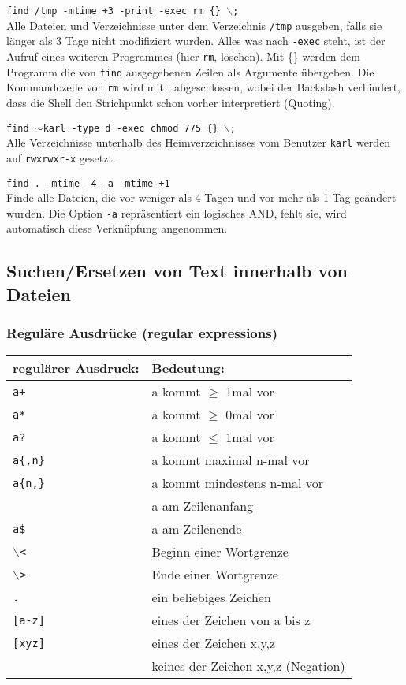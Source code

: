 \documentclass[11pt]{article}
\begin{document}
\texttt{find /tmp -mtime +3 -print -exec rm \{\} $\backslash$;} \\
Alle Dateien und Verzeichnisse unter dem Verzeichnis \texttt{/tmp}
ausgeben, falls sie länger als 3 Tage nicht modifiziert wurden.
Alles was nach \texttt{-exec} steht, ist der Aufruf eines weiteren
Programmes (hier \texttt{rm}, löschen). Mit \{\} werden dem Programm
die von \texttt{find} ausgegebenen Zeilen als Argumente übergeben. Die
Kommandozeile von \texttt{rm} wird mit ; abgeschlossen, wobei der
Backslash verhindert, dass die Shell den Strichpunkt schon vorher
interpretiert (Quoting).

\texttt{find $\sim$karl -type d -exec chmod 775 \{\} $\backslash$;} \\
Alle Verzeichnisse unterhalb des Heimverzeichnisses vom Benutzer
\texttt{karl} werden auf \texttt{rwxrwxr-x} gesetzt.

\texttt{find . -mtime -4 -a -mtime +1} \\
Finde alle Dateien, die vor weniger als 4 Tagen  und vor mehr als 1 Tag geändert wurden. Die Option \texttt{-a} repräsentiert ein logisches AND, fehlt sie, wird automatisch diese Verknüpfung angenommen.


\subsection{Suchen/Ersetzen von Text innerhalb von Dateien} 
\subsubsection{Reguläre Ausdrücke (regular expressions)}
\begin{tabular}{|l|l|}
\hline
regulärer Ausdruck: & Bedeutung:\\
\hline
\texttt{a+} & a kommt $\ge$ 1mal vor \\
\texttt{a*} & a kommt $\ge$ 0mal vor \\
\texttt{a?} & a kommt $\le$ 1mal vor \\
\texttt{a\{,n\}} & a kommt maximal n-mal vor \\
\texttt{a\{n,\}} & a kommt mindestens n-mal vor \\
\verb1^a1 & a am Zeilenanfang \\
\texttt{a\$} & a am Zeilenende \\
\texttt{$\backslash$<} & Beginn einer Wortgrenze \\
\texttt{$\backslash$>} & Ende einer Wortgrenze \\
\texttt{.} & ein beliebiges Zeichen \\
\texttt{[a-z]} & eines der Zeichen von a bis z \\
\texttt{[xyz]} & eines der Zeichen x,y,z \\
\verb1[^xyz]1 & keines der Zeichen x,y,z (Negation)\\
\hline
\end{tabular}\\
\end{document}
